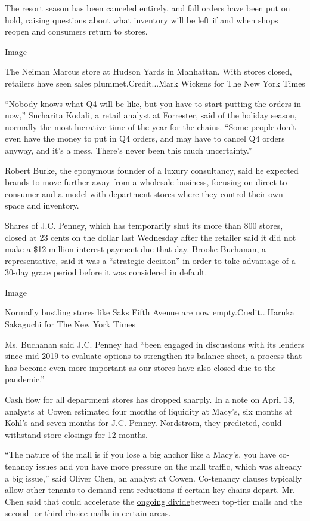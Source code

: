 The resort season has been canceled entirely, and fall orders have been
put on hold, raising questions about what inventory will be left if and
when shops reopen and consumers return to stores.

Image

The Neiman Marcus store at Hudson Yards in Manhattan. With stores
closed, retailers have seen sales plummet.Credit...Mark Wickens for The
New York Times

``Nobody knows what Q4 will be like, but you have to start putting the
orders in now,'' Sucharita Kodali, a retail analyst at Forrester, said
of the holiday season, normally the most lucrative time of the year for
the chains. ``Some people don't even have the money to put in Q4 orders,
and may have to cancel Q4 orders anyway, and it's a mess. There's never
been this much uncertainty.''

Robert Burke, the eponymous founder of a luxury consultancy, said he
expected brands to move further away from a wholesale business, focusing
on direct-to-consumer and a model with department stores where they
control their own space and inventory.

Shares of J.C. Penney, which has temporarily shut its more than 800
stores, closed at 23 cents on the dollar last Wednesday after the
retailer said it did not make a \$12 million interest payment due that
day. Brooke Buchanan, a representative, said it was a ``strategic
decision'' in order to take advantage of a 30-day grace period before it
was considered in default.

Image

Normally bustling stores like Saks Fifth Avenue are now
empty.Credit...Haruka Sakaguchi for The New York Times

Ms. Buchanan said J.C. Penney had ``been engaged in discussions with its
lenders since mid-2019 to evaluate options to strengthen its balance
sheet, a process that has become even more important as our stores have
also closed due to the pandemic.''

Cash flow for all department stores has dropped sharply. In a note on
April 13, analysts at Cowen estimated four months of liquidity at
Macy's, six months at Kohl's and seven months for J.C. Penney.
Nordstrom, they predicted, could withstand store closings for 12 months.

``The nature of the mall is if you lose a big anchor like a Macy's, you
have co-tenancy issues and you have more pressure on the mall traffic,
which was already a big issue,'' said Oliver Chen, an analyst at Cowen.
Co-tenancy clauses typically allow other tenants to demand rent
reductions if certain key chains depart. Mr. Chen said that could
accelerate the
\href{https://www.nytimes3xbfgragh.onion/2015/01/04/business/the-economics-and-nostalgia-of-dead-malls.html}{ongoing
divide}between top-tier malls and the second- or third-choice malls in
certain areas.

